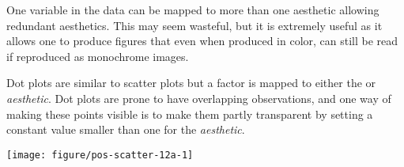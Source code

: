 \documentclass[krantz2]{krantz}\usepackage{knitr}%
\begin{document}
\begin{infobox}
  One variable in the data can be mapped to more than one aesthetic allowing redundant aesthetics. This may seem wasteful, but it is extremely useful as it allows one to produce figures that even when produced in color, can still be read if reproduced as monochrome images.

\begin{knitrout}\footnotesize
{}\color{fgcolor}\begin{kframe}
\begin{alltt}
\hlstd{(}  \hlstd{(}   
                           \hlstd{=} 
                           \hlstd{=}  \hlopt{+}
  \hlstd{()}
\end{alltt}
\end{kframe}
\end{knitrout}
\end{infobox}

Dot plots are similar to scatter plots but a factor is mapped to either the  or  \emph{aesthetic}. Dot plots are prone to have overlapping observations, and one way of making these points visible is to make them partly transparent by setting a constant value smaller than one for the  \emph{aesthetic}.

\begin{knitrout}\footnotesize
{}\color{fgcolor}\begin{kframe}
\begin{alltt}
\hlstd{(}  \hlstd{(} \hlstd{=}    \hlopt{+}
  \hlstd{(} \hlstd{=} \hlopt{/}\hlstd{)}
\end{alltt}
\end{kframe}

{\centering \texttt{[image: figure/pos-scatter-12a-1]} 

}



\end{knitrout}
\end{document}
